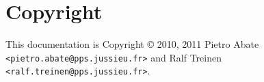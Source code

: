 \section{Copyright}
\label{sec:copyright}
This documentation is Copyright \copyright {} 2010, 2011 Pietro Abate
\verb|<pietro.abate@pps.jussieu.fr>| and Ralf Treinen
\verb|<ralf.treinen@pps.jussieu.fr>|.
